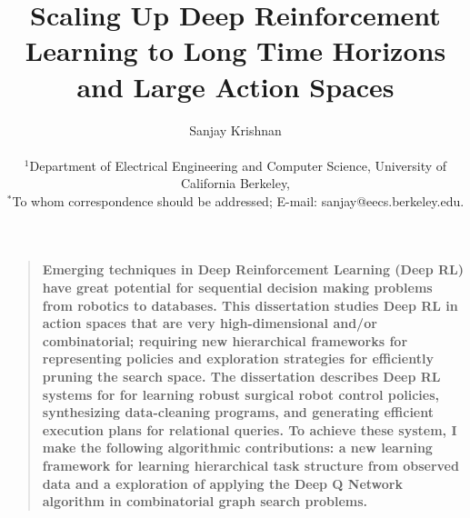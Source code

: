 \documentclass[12pt]{book}
\title{Scaling Up Deep Reinforcement Learning to Long Time Horizons and Large Action Spaces}
\author
{Sanjay Krishnan\\
\\
\normalsize{$^{1}$Department of Electrical Engineering and Computer Science, University of California Berkeley,}\\
\normalsize{$^\ast$To whom correspondence should be addressed; E-mail:  sanjay@eecs.berkeley.edu.}
}
\date{}
\newenvironment{sciabstract}{%
\begin{quote} \bf}
{\end{quote}}
\begin{document}
 


\baselineskip26pt


\maketitle 





\begin{sciabstract}
Emerging techniques in Deep Reinforcement
Learning (Deep RL) have great potential for sequential decision making problems from robotics to databases. This dissertation studies Deep RL in action spaces that are very high-dimensional and/or combinatorial; requiring new hierarchical frameworks for representing policies and exploration strategies for efficiently pruning the search space. The dissertation describes  Deep RL systems for for learning robust surgical robot control policies, synthesizing data-cleaning programs, and generating efficient execution plans for relational queries. To achieve these system, I make the following algorithmic contributions: a new learning framework for learning hierarchical task structure from observed data and a exploration of applying the Deep Q Network algorithm in combinatorial graph search problems.
\end{sciabstract}


\clearpage

\tableofcontents

\clearpage





















\end{document}
